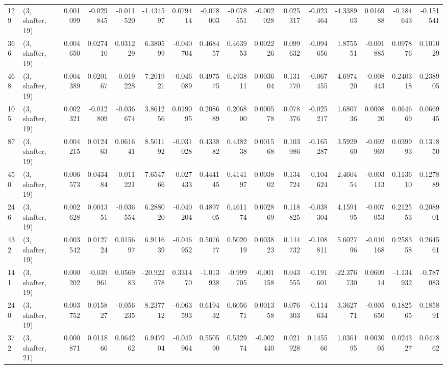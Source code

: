 \begin{tabular}{llrrrrrrrrrrrrrr}
129 &  (3, shafter, 19) &   0.001099 & -0.029845 & -0.011520 &    -1.434597 &   0.079414 &  -0.078003 &  -0.078551 & -0.002028 &  0.025317 & -0.023464 &   -4.338903 &  0.016988 & -0.184643 & -0.151541 \\
366 &  (3, shafter, 19) &   0.004650 &  0.027410 &  0.031229 &     6.380599 &  -0.040704 &   0.468457 &   0.463953 &  0.002226 &  0.099632 & -0.094656 &    1.875551 & -0.001885 &  0.097876 &  0.101029 \\
468 &  (3, shafter, 19) &   0.004389 &  0.020167 & -0.019228 &     7.201921 &  -0.046089 &   0.497575 &   0.493811 &  0.003604 &  0.131770 & -0.067455 &    4.697420 & -0.008443 &  0.240318 &  0.238905 \\
105 &  (3, shafter, 19) &   0.002321 & -0.012809 & -0.036674 &     3.861256 &   0.019095 &   0.208689 &   0.206800 &  0.000578 &  0.078376 & -0.025217 &    1.680736 &  0.000820 &  0.064669 &  0.066945 \\
87  &  (3, shafter, 19) &   0.004215 &  0.012463 &  0.061641 &     8.501192 &  -0.031028 &   0.433882 &   0.438238 &  0.001568 &  0.103986 & -0.165287 &    3.592960 & -0.002969 &  0.039993 &  0.131850 \\
450 &  (3, shafter, 19) &   0.006573 &  0.043484 & -0.011221 &     7.654766 &  -0.027433 &   0.444145 &   0.414197 &  0.003802 &  0.134724 & -0.104624 &    2.460454 & -0.003113 &  0.113610 &  0.127889 \\
246 &  (3, shafter, 19) &   0.002628 &  0.001351 & -0.036554 &     6.288020 &  -0.040204 &   0.489705 &   0.461174 &  0.002869 &  0.118825 & -0.038304 &    4.159195 & -0.007053 &  0.212553 &  0.208901 \\
432 &  (3, shafter, 19) &   0.003542 &  0.012724 &  0.015697 &     6.911639 &  -0.046952 &   0.507677 &   0.502019 &  0.003823 &  0.144732 & -0.108811 &    5.602796 & -0.010168 &  0.258358 &  0.264561 \\
141 &  (3, shafter, 19) &   0.000202 & -0.039961 &  0.056983 &   -20.922578 &   0.331470 &  -1.013938 &  -0.999705 & -0.001158 &  0.043555 & -0.191601 &  -22.376730 &  0.060914 & -1.134932 & -0.787083 \\
240 &  (3, shafter, 19) &   0.003752 &  0.015827 & -0.056235 &     8.237712 &  -0.063593 &   0.619432 &   0.605671 &  0.001358 &  0.076303 & -0.114634 &    3.362771 & -0.005650 &  0.182565 &  0.185891 \\
372 &  (3, shafter, 21) &   0.000871 &  0.011866 &  0.064262 &     6.947904 &  -0.049964 &   0.550590 &   0.532974 & -0.002440 &  0.021928 &  0.145566 &    1.036195 &  0.003005 &  0.024327 &  0.047862 \\

\end{tabular}
